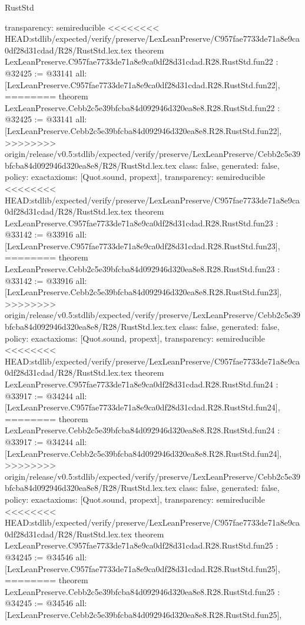 \begin{lexlean}{RustStd}
\begin{coremodule}
{\begin{coremodule}
{{{{{{{{{{{{{{{{{{{{{{{{{  transparency: semireducible
}
<<<<<<<< HEAD:stdlib/expected/verify/preserve/LexLeanPreserve/C957fae7733de71a8e9ca0df28d31cdad/R28/RustStd.lex.tex
theorem LexLeanPreserve.C957fae7733de71a8e9ca0df28d31cdad.R28.RustStd.fun22 : @32425 := @33141 {
  all: [LexLeanPreserve.C957fae7733de71a8e9ca0df28d31cdad.R28.RustStd.fun22],
========
theorem LexLeanPreserve.Cebb2c5e39bfcba84d092946d320ea8e8.R28.RustStd.fun22 : @32425 := @33141 {
  all: [LexLeanPreserve.Cebb2c5e39bfcba84d092946d320ea8e8.R28.RustStd.fun22],
>>>>>>>> origin/release/v0.5:stdlib/expected/verify/preserve/LexLeanPreserve/Cebb2c5e39bfcba84d092946d320ea8e8/R28/RustStd.lex.tex
  class: false,
  generated: false,
  policy: exact{axioms: [Quot.sound, propext]},
  transparency: semireducible
}
<<<<<<<< HEAD:stdlib/expected/verify/preserve/LexLeanPreserve/C957fae7733de71a8e9ca0df28d31cdad/R28/RustStd.lex.tex
theorem LexLeanPreserve.C957fae7733de71a8e9ca0df28d31cdad.R28.RustStd.fun23 : @33142 := @33916 {
  all: [LexLeanPreserve.C957fae7733de71a8e9ca0df28d31cdad.R28.RustStd.fun23],
========
theorem LexLeanPreserve.Cebb2c5e39bfcba84d092946d320ea8e8.R28.RustStd.fun23 : @33142 := @33916 {
  all: [LexLeanPreserve.Cebb2c5e39bfcba84d092946d320ea8e8.R28.RustStd.fun23],
>>>>>>>> origin/release/v0.5:stdlib/expected/verify/preserve/LexLeanPreserve/Cebb2c5e39bfcba84d092946d320ea8e8/R28/RustStd.lex.tex
  class: false,
  generated: false,
  policy: exact{axioms: [Quot.sound, propext]},
  transparency: semireducible
}
<<<<<<<< HEAD:stdlib/expected/verify/preserve/LexLeanPreserve/C957fae7733de71a8e9ca0df28d31cdad/R28/RustStd.lex.tex
theorem LexLeanPreserve.C957fae7733de71a8e9ca0df28d31cdad.R28.RustStd.fun24 : @33917 := @34244 {
  all: [LexLeanPreserve.C957fae7733de71a8e9ca0df28d31cdad.R28.RustStd.fun24],
========
theorem LexLeanPreserve.Cebb2c5e39bfcba84d092946d320ea8e8.R28.RustStd.fun24 : @33917 := @34244 {
  all: [LexLeanPreserve.Cebb2c5e39bfcba84d092946d320ea8e8.R28.RustStd.fun24],
>>>>>>>> origin/release/v0.5:stdlib/expected/verify/preserve/LexLeanPreserve/Cebb2c5e39bfcba84d092946d320ea8e8/R28/RustStd.lex.tex
  class: false,
  generated: false,
  policy: exact{axioms: [Quot.sound, propext]},
  transparency: semireducible
}
<<<<<<<< HEAD:stdlib/expected/verify/preserve/LexLeanPreserve/C957fae7733de71a8e9ca0df28d31cdad/R28/RustStd.lex.tex
theorem LexLeanPreserve.C957fae7733de71a8e9ca0df28d31cdad.R28.RustStd.fun25 : @34245 := @34546 {
  all: [LexLeanPreserve.C957fae7733de71a8e9ca0df28d31cdad.R28.RustStd.fun25],
========
theorem LexLeanPreserve.Cebb2c5e39bfcba84d092946d320ea8e8.R28.RustStd.fun25 : @34245 := @34546 {
  all: [LexLeanPreserve.Cebb2c5e39bfcba84d092946d320ea8e8.R28.RustStd.fun25],
}}}}}}}}}}}}}}}}}}}}}}}}}}}}}
\end{coremodule}}
\end{coremodule}
\end{lexlean}

